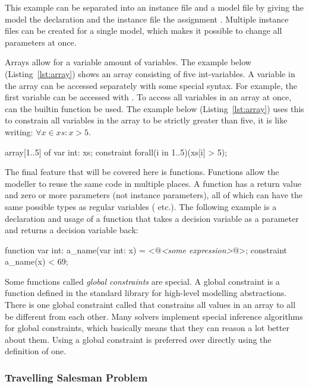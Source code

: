 \documentclass[a4paper,12pt]{article}
\begin{document}
This example can be separated into an instance file and a model file by giving
the model the declaration {} and the
instance file the assignment . Multiple instance files can be created
for a single model, which makes it possible to change all parameters at once.

Arrays allow for a variable amount of variables. The example below (Listing~\ref{lst:array}) shows an array 
consisting of five int-variables. A variable in the array can be accessed separately with
some special syntax. For example, the first variable can be accessed with
.
To access all variables in an array at once, can the builtin function  be used.
The example below (Listing~\ref{lst:array}) uses this to constrain all variables in the array to be strictly greater
than five, it is like writing: $\forall x \in xs : x > 5$.
\begin{mznnobreak}[label=lst:array,caption={\null}]
array[1..5] of var int: xs;
constraint forall(i in 1..5)(xs[i] > 5);
\end{mznnobreak}

The final feature that will be covered here is functions. Functions allow the modeller to
reuse the same code in multiple places. A function has a return value and zero or more
parameters (not instance parameters), all of which can have the same possible types as
regular variables ( etc.). The following example is a declaration and usage of a function that takes a decision variable as
a parameter and returns a decision variable back:
\begin{mznnobreak}
function var int: a_name(var int: x) = <@\textit{<some expression>}@>;
constraint a_name(x) < 69;
\end{mznnobreak}

Some functions called \emph{global constraints} are special. A global constraint is a
function defined in the standard library for high-level modelling abstractions. There is
one global constraint called  that constrains all values in an array to
all be different from each other. Many solvers implement special inference algorithms for
global constraints, which basically means that they can reason a lot better about them.
Using a global constraint is preferred over directly using the definition of one.

\subsubsection{Travelling Salesman Problem}\label{sec:tsp}
\end{document}
